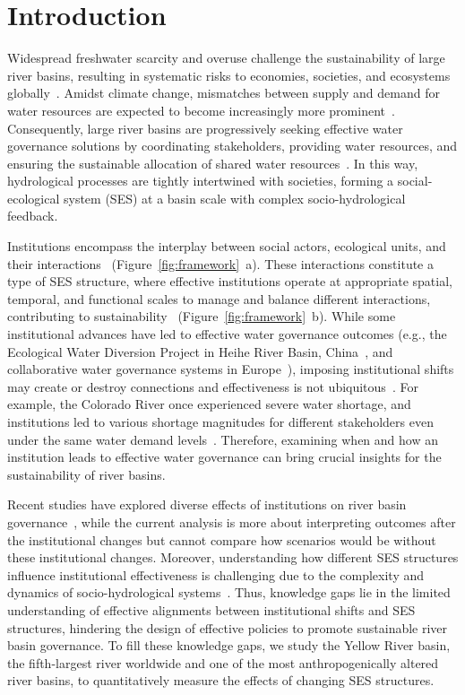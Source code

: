 \documentclass[preprint, 12pt]{elsarticle}
\begin{document}
\section{Introduction}\label{sec:introduction}
Widespread freshwater scarcity and overuse challenge the sustainability of large river basins, resulting in systematic risks to economies, societies, and ecosystems globally~\cite{distefano2017, dolan2021, xu2020b, mekonnen2016}.
Amidst climate change, mismatches between supply and demand for water resources are expected to become increasingly more prominent~\cite{florke2018, yoon2021}.
Consequently, large river basins are progressively seeking effective water governance solutions by coordinating stakeholders, providing water resources, and ensuring the sustainable allocation of shared water resources~\cite{wang2019d}.
In this way, hydrological processes are tightly intertwined with societies, forming a social-ecological system (SES) at a basin scale with complex socio-hydrological feedback.

Institutions encompass the interplay between social actors, ecological units, and their interactions~\cite{young2008, lien2020, bodin2017b, wang2022g} (Figure~\ref{fig:framework}~a).
These interactions constitute a type of SES structure, where effective institutions operate at appropriate spatial, temporal, and functional scales to manage and balance different interactions, contributing to sustainability~\cite{epstein2015, wang2019d} (Figure~\ref{fig:framework}~b).
While some institutional advances have led to effective water governance outcomes (e.g., the Ecological Water Diversion Project in Heihe River Basin, China~\cite{wang2019d}, and collaborative water governance systems in Europe~\cite{green2013}), imposing institutional shifts may create or destroy connections and effectiveness is not ubiquitous~\cite{loos2022}.
For example, the Colorado River once experienced severe water shortage, and institutions led to various shortage magnitudes for different stakeholders even under the same water demand levels~\cite{hadjimichael2020}.
Therefore, examining when and how an institution leads to effective water governance can bring crucial insights for the sustainability of river basins.

Recent studies have explored diverse effects of institutions on river basin governance~\cite{bouckaert2022, vallury2022, loch2020, kirchhoff2016}, while the current analysis is more about interpreting outcomes after the institutional changes but cannot compare how scenarios would be without these institutional changes.
Moreover, understanding how different SES structures influence institutional effectiveness is challenging due to the complexity and dynamics of socio-hydrological systems~\cite{bodin2017b}.
Thus, knowledge gaps lie in the limited understanding of effective alignments between institutional shifts and SES structures, hindering the design of effective policies to promote sustainable river basin governance.
To fill these knowledge gaps, we study the Yellow River basin, the fifth-largest river worldwide and one of the most anthropogenically altered river basins, to quantitatively measure the effects of changing SES structures.
\end{document}
